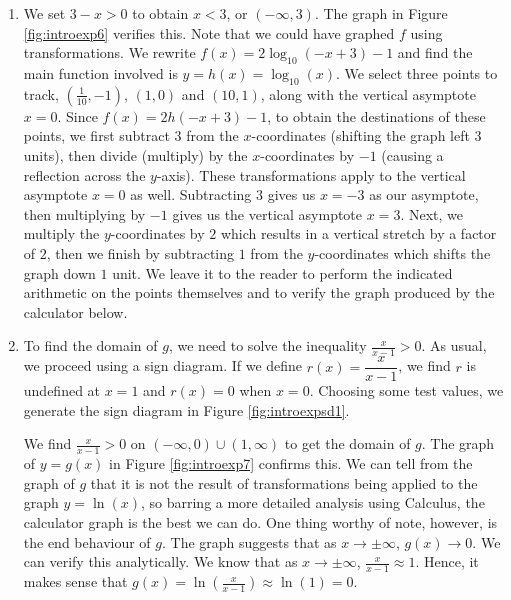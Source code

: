 {
\begin{enumerate}

\item  We set $3-x > 0$ to obtain $x<3$, or $(-\infty, 3)$.  The graph in Figure \ref{fig:introexp6} verifies this.  Note that we could have graphed $f$ using transformations.  We rewrite $f(x) = 2 \log_{10}(-x+3) -1$ and find the main function involved is $y = h(x) = \log_{10}(x)$.  We select three points to track,  $\left(\frac{1}{10}, -1\right)$, $(1,0)$ and $(10,1)$, along with the vertical asymptote $x=0$.   Since $f(x) = 2h(-x+3)-1$,  to obtain the destinations of these points, we first subtract $3$ from the $x$-coordinates (shifting the graph left $3$ units), then divide (multiply) by the $x$-coordinates by $-1$ (causing a reflection across the $y$-axis).  These transformations apply to the vertical asymptote $x = 0$ as well.  Subtracting $3$ gives us $x=-3$ as our asymptote, then multiplying by $-1$ gives us the vertical asymptote $x=3$.  Next, we multiply the $y$-coordinates by $2$ which results in a vertical stretch by a factor of $2$, then we finish by subtracting $1$ from the $y$-coordinates which shifts the graph down $1$ unit.  We leave it to the reader to perform the indicated arithmetic on the points themselves and to verify the graph produced by the calculator below.


\item  To find the domain of $g$, we need to solve the inequality $\frac{x}{x-1} > 0$. As usual, we proceed using a sign diagram.  If we define $r(x) = \dfrac{x}{x-1}$, we find $r$ is undefined at $x=1$ and $r(x) = 0$ when $x=0$.  Choosing some test values, we generate the sign diagram in Figure \ref{fig:introexpsd1}.  



We find $ \frac{x}{x-1} > 0$ on $(-\infty, 0) \cup (1, \infty)$ to get the domain of $g$.  The graph of $y=g(x)$ in Figure \ref{fig:introexp7} confirms this.  We can tell from the graph of $g$ that it is not the result of  transformations being applied to the graph $y = \ln(x)$, so barring a more detailed analysis using Calculus, the calculator graph is the best we can do.  One thing worthy of note, however, is the end behaviour of $g$.  The graph suggests that as $x \rightarrow \pm \infty$, $g(x) \rightarrow 0$.  We can verify this analytically.  We know that as $x \rightarrow \pm \infty$, $\frac{x}{x-1} \approx 1$.  Hence, it makes sense that $g(x) = \ln \left(\frac{x}{x-1}\right) \approx \ln(1) = 0$.

\end{enumerate}
}

